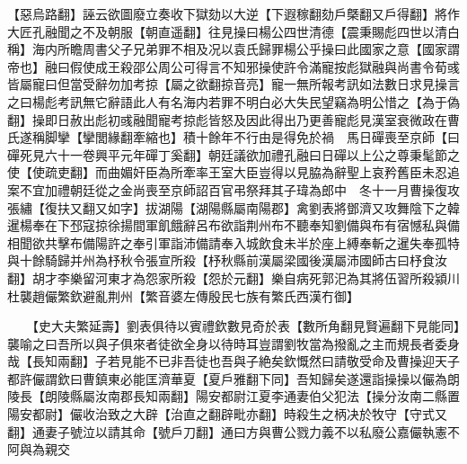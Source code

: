 【惡烏路翻】誣云欲圖廢立奏收下獄劾以大逆【下遐稼翻劾戶槩翻又戶得翻】將作大匠孔融聞之不及朝服【朝直遥翻】往見操曰楊公四世清德【震秉賜彪四世以清白稱】海内所瞻周書父子兄弟罪不相及况以袁氏歸罪楊公乎操曰此國家之意【國家謂帝也】融曰假使成王殺邵公周公可得言不知邪操使許令滿寵按彪獄融與尚書令荀彧皆屬寵曰但當受辭勿加考掠【屬之欲翻掠音亮】寵一無所報考訊如法數日求見操言之曰楊彪考訊無它辭語此人有名海内若罪不明白必大失民望竊為明公惜之【為于偽翻】操即日赦出彪初彧融聞寵考掠彪皆怒及因此得出乃更善寵彪見漢室衰微政在曹氏遂稱脚攣【攣閭緣翻牽縮也】積十餘年不行由是得免於禍　馬日磾喪至京師【曰磾死見六十一卷興平元年磾丁奚翻】朝廷議欲加禮孔融曰日磾以上公之尊秉髦節之使【使疏吏翻】而曲媚奸臣為所牽率王室大臣豈得以見脇為辭聖上哀矜舊臣未忍追案不宜加禮朝廷從之金尚喪至京師詔百官弔祭拜其子瑋為郎中　冬十一月曹操復攻張繡【復扶又翻又如字】拔湖陽【湖陽縣屬南陽郡】禽劉表將鄧濟又攻舞陰下之韓暹楊奉在下邳寇掠徐揚間軍飢餓辭呂布欲詣荆州布不聽奉知劉備與布有宿憾私與備相聞欲共擊布備陽許之奉引軍詣沛備請奉入城飲食未半於座上縛奉斬之暹失奉孤特與十餘騎歸并州為杼秋令張宣所殺【杼秋縣前漢屬梁國後漢屬沛國師古曰杼食汝翻】胡才李樂留河東才為怨家所殺【怨於元翻】樂自病死郭汜為其將伍習所殺潁川杜襲趙儼繁欽避亂荆州【繁音婆左傳殷民七族有繁氏西漢冇御】

　　【史大夫繁延壽】劉表俱待以賓禮欽數見奇於表【數所角翻見賢遍翻下見能同】襲喻之曰吾所以與子俱來者徒欲全身以待時耳豈謂劉牧當為撥亂之主而規長者委身哉【長知兩翻】子若見能不已非吾徒也吾與子絶矣欽慨然曰請敬受命及曹操迎天子都許儼謂欽曰曹鎮東必能匡濟華夏【夏戶雅翻下同】吾知歸矣遂還詣操操以儼為朗陵長【朗陵縣屬汝南郡長知兩翻】陽安都尉江夏李通妻伯父犯法【操分汝南二縣置陽安都尉】儼收治致之大辟【治直之翻辟毗亦翻】時殺生之柄决於牧守【守式又翻】通妻子號泣以請其命【號戶刀翻】通曰方與曹公戮力義不以私廢公嘉儼執憲不阿與為親交

